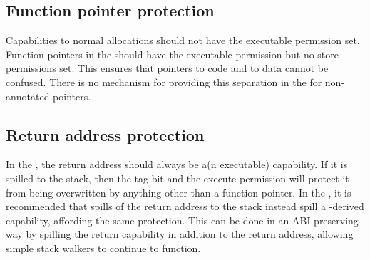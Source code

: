 \subsection{Function pointer protection}

Capabilities to normal allocations should not have the executable permission set.
Function pointers in the \sandboxABI{} should have the executable permission but no store permissions set.
This ensures that pointers to code and to data cannot be confused.
There is no mechanism for providing this separation in the \hybridABI{} for non-annotated pointers.

\subsection{Return address protection}

In the \sandboxABI{}, the return address should always be a(n executable) capability.
If it is spilled to the stack, then the tag bit and the execute permission will protect it from being overwritten by anything other than a function pointer.
In the \hybridABI{}, it is recommended that spills of the return address to the stack instead spill a -derived capability, affording the same protection.
This can be done in an ABI-preserving way by spilling the return capability in addition to the return address, allowing simple stack walkers to continue to function.
